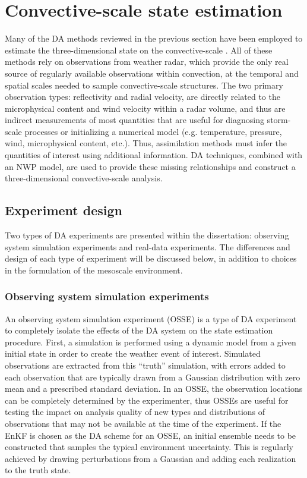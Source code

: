 \pagebreak
\section{Convective-scale state estimation}
Many of the DA methods reviewed in the previous section have been employed to estimate the three-dimensional state on the convective-scale \citep{sunetal05}. All of these methods rely on observations from weather radar, which provide the only real source of regularly available observations within convection, at the temporal and spatial scales needed to sample convective-scale structures. The two primary observation types: reflectivity and radial velocity, are directly related to the microphysical content and wind velocity within a radar volume, and thus are indirect measurements of most quantities that are useful for diagnosing storm-scale processes or initializing a numerical model (e.g. temperature, pressure, wind, microphysical content, etc.). Thus, assimilation methods must infer the quantities of interest using additional information. DA techniques, combined with an NWP model, are used to provide these missing relationships and construct a three-dimensional convective-scale analysis.

\subsection{Experiment design}
Two types of DA experiments are presented within the dissertation: observing system simulation experiments and real-data experiments. The differences and design of each type of experiment will be discussed below, in addition to choices in the formulation of the mesoscale environment.

\subsubsection{Observing system simulation experiments}
An observing system simulation experiment (OSSE) is a type of DA experiment to completely isolate the effects of the DA system on the state estimation procedure. First, a simulation is performed using a dynamic model from a given initial state in order to create the weather event of interest. Simulated observations are extracted from this “truth” simulation, with errors added to each observation that are typically drawn from a Gaussian distribution with zero mean and a prescribed standard deviation. In an OSSE, the observation locations can be completely determined by the experimenter, thus OSSEs are useful for testing the impact on analysis quality of new types and distributions of observations that may not be available at the time of the experiment. If the EnKF is chosen as the DA scheme for an OSSE, an initial ensemble needs to be constructed that samples the typical environment uncertainty. This is regularly achieved by drawing perturbations from a Gaussian and adding each realization to the truth state.

